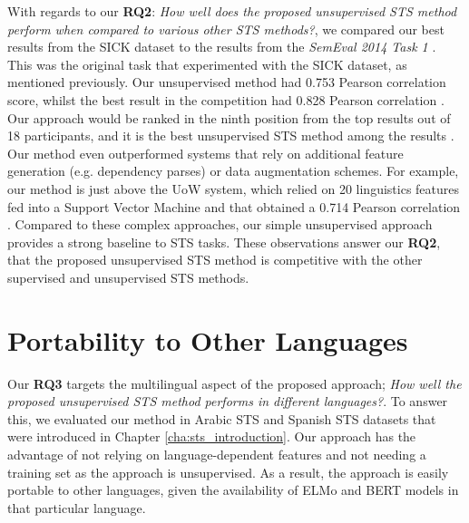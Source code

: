 \begin{enumerate}
With regards to our \textbf{RQ2}: \textit{How well does the proposed unsupervised STS method perform when compared to various other STS methods?}, we compared our best results from the SICK dataset to the results from the \textit{SemEval 2014 Task 1} \autocite{marelli-etal-2014-semeval}. This was the original task that experimented with the SICK dataset, as mentioned previously. Our unsupervised method had 0.753 Pearson correlation score, whilst the best result in the competition had 0.828 Pearson correlation \autocite{marelli-etal-2014-semeval}. Our approach would be ranked in the ninth position from the top results out of 18 participants, and it is the best unsupervised STS method among the results \autocite{marelli-etal-2014-semeval}. Our method even outperformed systems that rely on additional feature generation (e.g. dependency parses) or data augmentation schemes. For example, our method is just above the UoW system, which relied on 20 linguistics features fed into a Support Vector Machine and that obtained a 0.714 Pearson correlation \autocite{gupta-etal-2014-uow}. Compared to these complex approaches, our simple unsupervised approach provides a strong baseline to STS tasks. These observations answer our \textbf{RQ2}, that the proposed unsupervised STS method is competitive with the other supervised and unsupervised STS methods. 

\end{enumerate}


\section{Portability to Other Languages}
\label{sec:state_languages}
Our \textbf{RQ3} targets the multilingual aspect of the proposed approach; \textit{How well the proposed unsupervised STS method performs in different languages?}. To answer this, we evaluated our method in Arabic STS and Spanish STS datasets that were introduced in Chapter \ref{cha:sts_introduction}. Our approach has the advantage of not relying on language-dependent features and not needing a training set as the approach is unsupervised. As a result, the approach is easily portable to other languages, given the availability of ELMo and BERT models in that particular language. 

